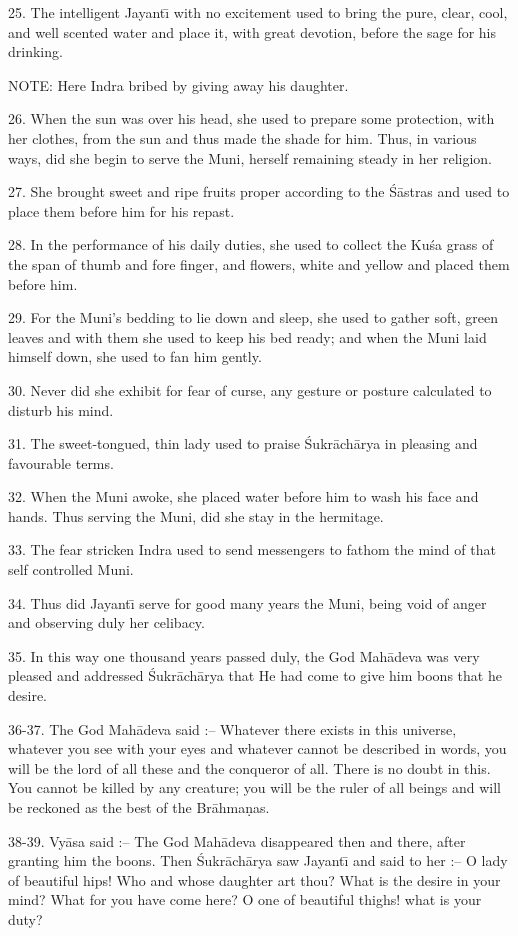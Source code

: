 25. The intelligent Jayant\={\i} with no excitement used to bring the pure, clear, cool, and well scented water and place it, with great devotion, before the sage for his drinking.

NOTE: Here Indra bribed by giving away his daughter.

26. When the sun was over his head, she used to prepare some protection, with her clothes, from the sun and thus made the shade for him. Thus, in various ways, did she begin to serve the Muni, herself remaining steady in her religion.

27. She brought sweet and ripe fruits proper according to the \'S\=astras and used to place them before him for his repast.

28. In the performance of his daily duties, she used to collect the Ku\'sa grass of the span of thumb and fore finger, and flowers, white and yellow and placed them before him.

29. For the Muni's bedding to lie down and sleep, she used to gather soft, green leaves and with them she used to keep his bed ready; and when the Muni laid himself down, she used to fan him gently.

30. Never did she exhibit for fear of curse, any gesture or posture calculated to disturb his mind.

31. The sweet-tongued, thin lady used to praise \'Sukr\=ach\=arya in pleasing and favourable terms.

32. When the Muni awoke, she placed water before him to wash his face and hands. Thus serving the Muni, did she stay in the hermitage.

33. The fear stricken Indra used to send messengers to fathom the mind of that self controlled Muni.

34. Thus did Jayant\={\i} serve for good many years the Muni, being void of anger and observing duly her celibacy.

35. In this way one thousand years passed duly, the God Mah\=adeva was very pleased and addressed \'Sukr\=ach\=arya that He had come to give him boons that he desire.

36-37. The God Mah\=adeva said :-- Whatever there exists in this universe, whatever you see with your eyes and whatever cannot be described in words, you will be the lord of all these and the conqueror of all. There is no doubt in this. You cannot be killed by any creature; you will be the ruler of all beings and will be reckoned as the best of the Br\=ahma\d{n}as.

38-39. Vy\=asa said :-- The God Mah\=adeva disappeared then and there, after granting him the boons. Then \'Sukr\=ach\=arya saw Jayant\={\i} and said to her :-- O lady of beautiful hips! Who and whose daughter art thou? What is the desire in your mind? What for you have come here? O one of beautiful thighs! what is your duty?

